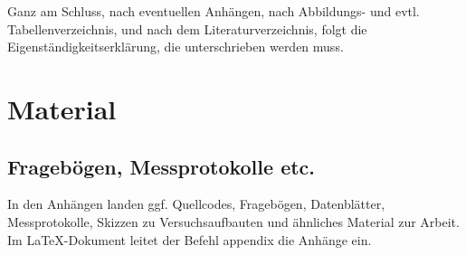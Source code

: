 Ganz am Schluss, nach eventuellen Anhängen, nach Abbildungs- und evtl. Tabellenverzeichnis, und nach dem Literaturverzeichnis, folgt die Eigenständigkeitserklärung, die unterschrieben werden muss.


\appendix
\chapter{Material}

\section{Fragebögen, Messprotokolle etc.}
In den Anhängen landen ggf. Quellcodes, Fragebögen, Datenblätter, Messprotokolle, Skizzen zu Versuchsaufbauten und ähnliches Material zur Arbeit. Im \LaTeX-Dokument leitet der Befehl appendix die Anhänge ein.




\listoffigures %
\listoftables %


